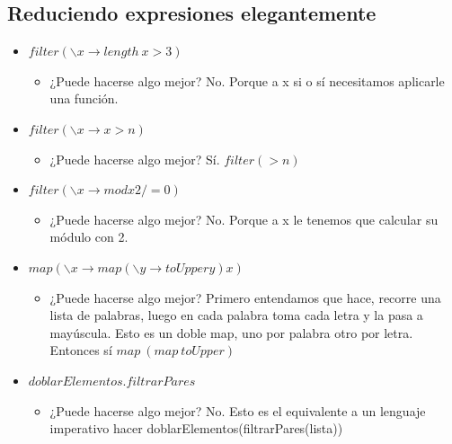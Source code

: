 \documentclass[10pt,a4paper]{article}
\begin{document}
\subsection*{Reduciendo expresiones elegantemente}
\begin{itemize}
    \item $filter(\backslash x \rightarrow length \ x > 3)$
    \begin{itemize}
        \item  ¿Puede hacerse algo mejor? No. Porque a x si o sí necesitamos aplicarle una función.
    \end{itemize}
    \item $filter(\backslash x \rightarrow x > n)$
    \begin{itemize}
        \item ¿Puede hacerse algo mejor? Sí. $filter (>n)$
    \end{itemize}
    \item $filter (\backslash x \rightarrow mod x 2 /= 0)$
    \begin{itemize}
        \item ¿Puede hacerse algo mejor? No. Porque a x le tenemos que calcular su módulo con 2.
    \end{itemize}
    \item $map(\backslash x \rightarrow map (\backslash y \rightarrow toUpper y) x)$
    \begin{itemize}
        \item ¿Puede hacerse algo mejor? Primero entendamos que hace, recorre una lista de palabras, luego en cada palabra toma cada letra y la pasa a mayúscula. Esto es un doble map, uno por palabra otro por letra. Entonces sí $map \ (map \ toUpper)$
    \end{itemize}
    \item $doblarElementos . filtrarPares$
    \begin{itemize}
        \item ¿Puede hacerse algo mejor? No. Esto es el equivalente a un lenguaje imperativo hacer doblarElementos(filtrarPares(lista))
    \end{itemize}

\end{itemize}
\end{document}

